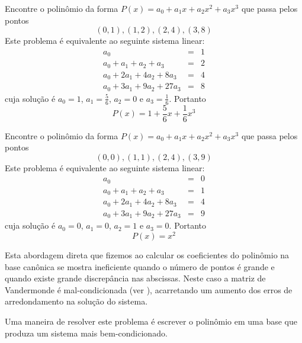 \begin{ex} Encontre o polinômio da forma $P(x)=a_0+a_1x+a_2x^2+a_3x^3$ que passa pelos pontos
$$(0,1),(1,2),(2,4),(3,8)$$
Este problema é equivalente ao seguinte sistema linear:
\begin{eqnarray*}
a_0&=&1\\
a_0+a_1+a_2+a_3&=&2\\
a_0+2a_1+4a_2+8a_3&=&4\\
a_0+3a_1+9a_2+27a_3&=&8
\end{eqnarray*}
cuja solução é $a_0=1$, $a_1=\frac{5}{6}$, $a_2=0$ e $a_3=\frac{1}{6}$. Portanto
$$P(x)=1+\frac{5}{6}x+\frac{1}{6}x^3$$
\end{ex}

\begin{ex} Encontre o polinômio da forma $P(x)=a_0+a_1x+a_2x^2+a_3x^3$ que passa pelos pontos
$$(0,0),(1,1),(2,4),(3,9)$$
Este problema é equivalente ao seguinte sistema linear:
\begin{eqnarray*}
a_0&=&0\\
a_0+a_1+a_2+a_3&=&1\\
a_0+2a_1+4a_2+8a_3&=&4\\
a_0+3a_1+9a_2+27a_3&=&9
\end{eqnarray*}
cuja solução é $a_0=0$, $a_1=0$, $a_2=1$ e $a_3=0$. Portanto
$$P(x)=x^2$$
\end{ex}

Esta abordagem direta que fizemos ao calcular os coeficientes do polinômio na base canônica se mostra ineficiente quando o número de pontos é grande e quando existe grande discrepância nas abscissas. Neste caso a matriz de Vandermonde é mal-condicionada (ver \cite{Gautschi}), acarretando um aumento dos erros de arredondamento na solução do sistema.

Uma maneira de resolver este problema é escrever o polinômio em uma base que produza um sistema mais bem-condicionado.

